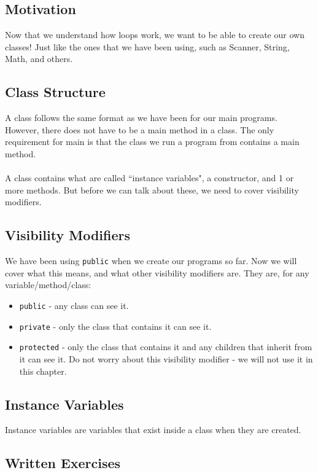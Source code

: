 
\subsection{Motivation}
Now that we understand how loops work, we want to be able to create our own classes! Just like the ones that we have been using, such as Scanner, String, Math, and others. 

\subsection{Class Structure}
A class follows the same format as we have been for our main programs. However, there does not have to be a main method in a class. The only requirement for main is that the class we run a program from contains a main method.
\\ \\
A class contains what are called ``instance variables", a constructor, and 1 or more methods. But before we can talk about these, we need to cover visibility modifiers.

\subsection{Visibility Modifiers}
We have been using \verb|public| when we create our programs so far. Now we will cover what this means, and what other visibility modifiers are. They are, for any variable/method/class:
\begin{itemize}
\item \verb|public| - any class can see it.
\item \verb|private| - only the class that contains it can see it.
\item \verb|protected| - only the class that contains it and any children that inherit from it can see it. Do not worry about this visibility modifier - we will not use it in this chapter.
\end{itemize}

\subsection{Instance Variables}
Instance variables are variables that exist inside a class when they are created. 

\subsection{Written Exercises}

